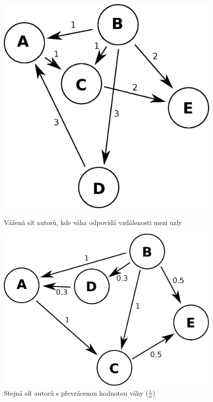 \documentclass{bakalarka}
\begin{document}
\begin{figure}[!ht]
\begin{minipage}[b]{0.45\textwidth}
\centering
	\includegraphics[width=\textwidth]{wNormal.eps}
	\caption{Vážená síť autorů, kde váha odpovídá vzdálenosti mezi uzly}
	\label{fig:wNormal}
\end{minipage}
\hspace{0.5cm}
\begin{minipage}[b]{0.45\textwidth}
\centering
	\includegraphics[width=\textwidth]{wRecip.eps}
	\caption{Stejná síť autorů s převrácenou hodnotou váhy ($\frac{1}{w}$)}
	\label{fig:wRecip}
\end{minipage}
\end{figure}
\end{document}
